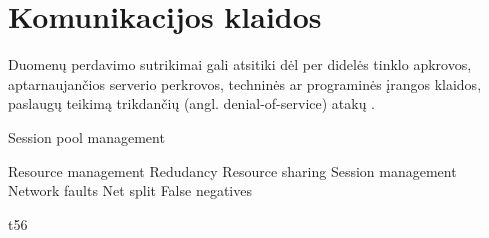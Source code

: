 \section{Komunikacijos klaidos}

Duomenų perdavimo sutrikimai gali atsitiki dėl per didelės tinklo apkrovos, aptarnaujančios serverio perkrovos,
techninės ar programinės įrangos klaidos, paslaugų teikimą trikdančių (angl. denial-of-service) atakų \cite{ayari2008fault}.


Session pool management

Resource management
Redudancy
Resource sharing
Session management
Network faults
Net split
False negatives

t56